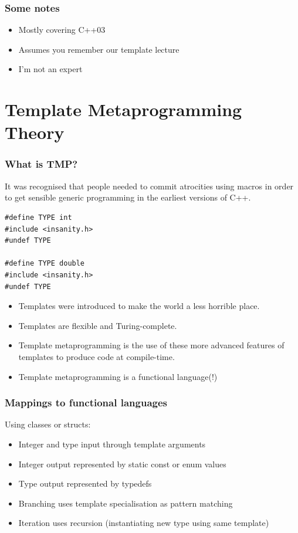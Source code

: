 \documentclass{beamer}
\begin{document}
  \begin{frame}
    \frametitle{Some notes}
    \begin{itemize}
      \pause
      \item Mostly covering C++03
      \pause
      \item Assumes you remember our template lecture
      \pause
      \item I'm not an expert
    \end{itemize}
  \end{frame}
  \section{Template Metaprogramming Theory}
  \begin{frame}[fragile]
    \frametitle{What is TMP?}
    \pause
    It was recognised that people needed to commit atrocities using macros in
    order to get sensible generic programming in the earliest versions of C++.
    \pause

    \begin{lstlisting}
#define TYPE int
#include <insanity.h>
#undef TYPE

#define TYPE double
#include <insanity.h>
#undef TYPE
    \end{lstlisting}

    \begin{itemize}
      \pause
      \item Templates were introduced to make the world a less horrible place.
      \pause
      \item Templates are flexible and Turing-complete.
      \pause
      \item Template metaprogramming is the use of these more advanced features
        of templates to produce code at compile-time.
      \pause
      \item Template metaprogramming is a functional language(!)
    \end{itemize}
\end{frame}
  \begin{frame}
    \frametitle{Mappings to functional languages}
    Using classes or structs:
    \begin{itemize}
        \pause
        \item Integer and type input through template arguments
        \pause
        \item Integer output represented by static const or enum values
        \pause
        \item Type output represented by typedefs
        \pause
        \item Branching uses template specialisation as pattern matching
        \pause
        \item Iteration uses recursion (instantiating new type using same
          template)
    \end{itemize}
  \end{frame}
\end{document}
